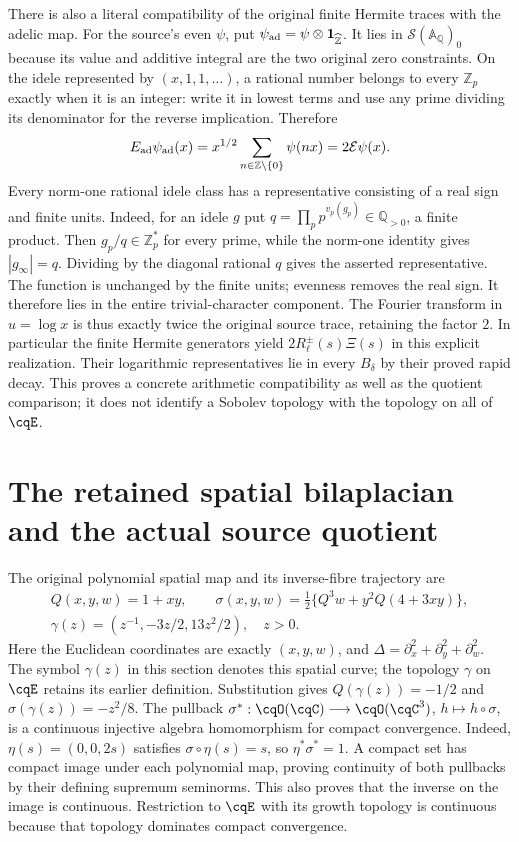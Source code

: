 There is also a literal compatibility of the original finite Hermite
traces with the adelic map. For the source's even $\psi$, put
$\psi_{\rm ad}=\psi\otimes\mathbf1_{\widehat{\mathbb Z}}$.
It lies in $\mathcal S(\mathbb A_{\mathbb Q})_0$ because its value
and additive integral are the two original zero constraints.
On the idele represented by $(x,1,1,\ldots)$, a rational number
belongs to every $\mathbb Z_p$ exactly when it is an integer:
write it in lowest terms and use any prime dividing its denominator
for the reverse implication. Therefore
\[
 E_{\rm ad}\psi_{\rm ad}(x)
   =x^{1/2}\sum_{n\in\mathbb Z\setminus\{0\}}\psi(nx)
   =2\mathcal E\psi(x).
\]
Every norm-one rational idele class has a representative consisting
of a real sign and finite units. Indeed, for an idele $g$ put
$q=\prod_p p^{v_p(g_p)}\in\mathbb Q_{>0}$, a finite product.
Then $g_p/q\in\mathbb Z_p^*$ for every prime, while the
norm-one identity gives $|g_\infty|=q$. Dividing by the diagonal
rational $q$ gives the asserted representative. The function
is unchanged by the finite units; evenness removes the real sign.
It therefore lies in the entire trivial-character component.
The Fourier transform in $u=\log x$ is thus exactly twice the
original source trace, retaining the factor $2$. In particular the
finite Hermite generators yield $2R_\ell^\pm(s)\Xi(s)$ in this
explicit realization. Their logarithmic representatives lie in
every $B_\delta$ by their proved rapid decay. This proves a concrete
arithmetic compatibility as well as the quotient comparison; it
does not identify a Sobolev topology with the topology on all of
$\cqE$.

\section{The retained spatial bilaplacian and the actual source quotient}
\label{sec:cq-bilaplacian-source}

The original polynomial spatial map and its inverse-fibre trajectory are
\begin{gather*}
 Q(x,y,w)=1+xy,\qquad
 \sigma(x,y,w)=\tfrac12\{Q^3w+y^2Q(4+3xy)\},\\
 \gamma(z)=(z^{-1},-3z/2,13z^2/2),\quad z>0.
\end{gather*}
Here the Euclidean coordinates are exactly $(x,y,w)$, and
$\Delta=\partial_x^2+\partial_y^2+\partial_w^2$.
The symbol $\gamma(z)$ in this section denotes this spatial curve;
the topology $\gamma$ on $\cqE$ retains its earlier definition.
Substitution gives $Q(\gamma(z))=-1/2$ and
$\sigma(\gamma(z))=-z^2/8$.
The pullback
$\sigma^*:\cqO(\cqC)\longrightarrow\cqO(\cqC^3)$,
$h\longmapsto h\circ\sigma$, is a continuous injective algebra
homomorphism for compact convergence. Indeed,
$\eta(s)=(0,0,2s)$ satisfies $\sigma\circ\eta(s)=s$,
so $\eta^*\sigma^*=1$. A compact set has compact image under each
polynomial map, proving continuity of both pullbacks by their
defining supremum seminorms. This also proves that the inverse on
the image is continuous. Restriction to $\cqE$ with its growth
topology is continuous because that topology dominates compact
convergence.

